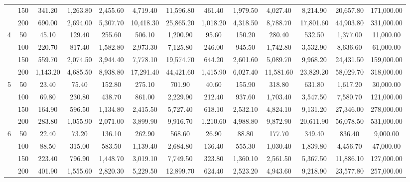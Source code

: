\begin{table}[htbp]
\begin{adjustbox}{angle=90}
{\begin{tabular}{|c|c|c|c|c|c|c|c|c|c|c|c|c|}
     & 150 & 341.20 & 1,263.80 & 2,455.60 & 4,719.40 & 11,596.80 & 461.40 & 1,979.50 & 4,027.40 & 8,214.90 & 20,657.80                      & 171,000.00 \\
     & 200 & 690.00 & 2,694.00 & 5,307.70 & 10,418.30 & 25,865.20 & 1,018.20 & 4,318.50 & 8,788.70 & 17,801.60 & 44,903.80                  & 331,000.00 \\ \hline
    4 & 50 & 45.10 & 129.40 & 255.60 & 506.10 & 1,200.90 & 95.60 & 150.20 & 280.40 & 532.50 & 1,377.00                                      & 11,000.00 \\
     & 100 & 220.70 & 817.40 & 1,582.80 & 2,973.30 & 7,125.80 & 246.00 & 945.50 & 1,742.80 & 3,532.90 & 8,636.60                            & 61,000.00 \\
     & 150 & 559.70 & 2,074.50 & 3,944.40 & 7,778.10 & 19,574.70 & 644.20 & 2,601.60 & 5,089.70 & 9,968.20 & 24,431.50                      & 159,000.00 \\
     & 200 & 1,143.20 & 4,685.50 & 8,938.80 & 17,291.40 & 44,421.60 & 1,415.90 & 6,027.40 & 11,581.60 & 23,829.20 & 58,029.70               & 318,000.00 \\ \hline
    5 & 50 & 23.40 & 75.40 & 152.80 & 275.10 & 701.90 & 40.60 & 155.90 & 318.80 & 631.80 & 1,617.20                                         & 30,000.00 \\
     & 100 & 69.80 & 230.80 & 438.70 & 861.00 & 2,229.90 & 212.40 & 937.60 & 1,703.40 & 3,547.50 & 7,580.70                                 & 121,000.00 \\
     & 150 & 164.90 & 596.50 & 1,134.80 & 2,415.50 & 5,727.40 & 618.10 & 2,532.10 & 4,824.10 & 9,131.20 & 27,346.00                         & 278,000.00 \\
     & 200 & 283.80 & 1,055.90 & 2,071.00 & 3,899.90 & 9,916.70 & 1,210.60 & 4,988.80 & 9,872.90 & 20,611.90 & 56,078.50                    & 531,000.00 \\ \hline
    6 & 50 & 22.40 & 73.20 & 136.10 & 262.90 & 568.60 & 26.90 & 88.80 & 177.70 & 349.40 & 836.40                                            & 9,000.00 \\
     & 100 & 88.50 & 315.00 & 583.50 & 1,139.40 & 2,684.80 & 136.40 & 555.30 & 1,030.40 & 1,839.80 & 4,456.70                               & 47,000.00 \\
     & 150 & 223.40 & 796.90 & 1,448.70 & 3,019.10 & 7,749.50 & 323.80 & 1,360.10 & 2,561.50 & 5,367.50 & 11,886.10                         & 127,000.00 \\
     & 200 & 401.90 & 1,555.60 & 2,820.30 & 5,229.50 & 12,899.70 & 624.40 & 2,523.20 & 4,943.60 & 9,218.90 & 23,577.80                      & 257,000.00 \\ \hline

\end{tabular}}
\end{adjustbox}
\end{table}
